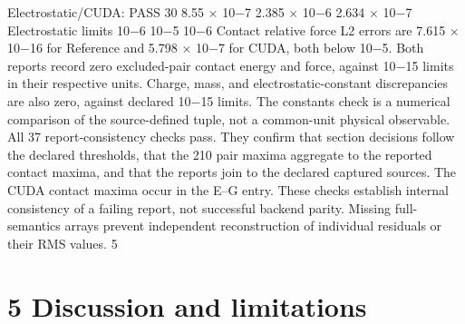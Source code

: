 \documentclass[11pt]{article}
\begin{document}
Electrostatic/CUDA: PASS 30 8.55 \ensuremath{\times} 10\ensuremath{-}7 2.385 \ensuremath{\times} 10\ensuremath{-}6 2.634 \ensuremath{\times} 10\ensuremath{-}7
Electrostatic limits 10\ensuremath{-}6 10\ensuremath{-}5 10\ensuremath{-}6
Contact relative force L2 errors are 7.615 \ensuremath{\times} 10\ensuremath{-}16 for Reference and 5.798 \ensuremath{\times} 10\ensuremath{-}7 for CUDA,
both below 10\ensuremath{-}5. Both reports record zero excluded-pair contact energy and force, against 10\ensuremath{-}15
limits in their respective units. Charge, mass, and electrostatic-constant discrepancies are also zero,
against declared 10\ensuremath{-}15 limits. The constants check is a numerical comparison of the source-defined
tuple, not a common-unit physical observable.
All 37 report-consistency checks pass. They confirm that section decisions follow the declared
thresholds, that the 210 pair maxima aggregate to the reported contact maxima, and that the
reports join to the declared captured sources. The CUDA contact maxima occur in the E–G
entry. These checks establish internal consistency of a failing report, not successful backend parity.
Missing full-semantics arrays prevent independent reconstruction of individual residuals or their
RMS values.
5


\section*{5 Discussion and limitations}
\end{document}
